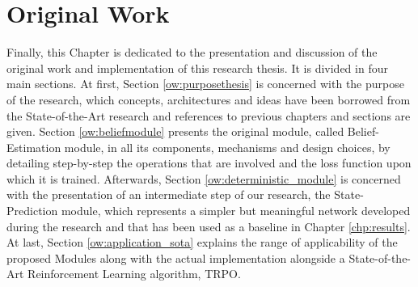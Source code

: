 \chapter{Original Work}
    \label{chp:ow}
    Finally, this Chapter is dedicated to the presentation and discussion of the original work and implementation of this research thesis. It is divided in four main sections. At first, Section \ref{ow:purposethesis} is concerned with the purpose of the research, which concepts, architectures and ideas have been borrowed from the State-of-the-Art research and references to previous chapters and sections are given. Section \ref{ow:beliefmodule} presents the original module, called Belief-Estimation module, in all its components, mechanisms and design choices, by detailing step-by-step the operations that are involved and the loss function upon which it is trained. Afterwards, Section \ref{ow:deterministic_module} is concerned with the presentation of an intermediate step of our research, the State-Prediction module, which represents a simpler but meaningful network developed during the research and that has been used as a baseline in Chapter \ref{chp:results}. At last, Section \ref{ow:application_sota} explains the range of applicability of the proposed Modules along with the actual implementation alongside a State-of-the-Art Reinforcement Learning algorithm, TRPO.
    
